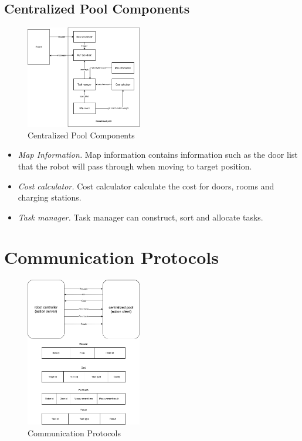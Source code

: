 \subsection{Centralized Pool Components}

\begin{figure}[htb]
	\centering
	\includegraphics[width = 0.45\textwidth]{content/images/ch3/system_component_centralized_pool.drawio.png}
	\caption{Centralized Pool Components}
	\label{fig:centralized_pool_components}
\end{figure}

\begin{itemize}
	\item \textsl{Map Information.} Map information contains information such as the door list that the robot will pass through when moving to target position.
	\item \textsl{Cost calculator.} Cost calculator calculate the cost for doors, rooms and charging stations.
	\item \textsl{Task manager.} Task manager can construct, sort and allocate tasks.
\end{itemize}


\section{Communication Protocols}

\begin{figure}[htb]
	\centering
	\includegraphics[width = 0.45\textwidth]{content/images/ch3/communication_protocals.drawio.png}
	\caption{Communication Protocols}
	\label{fig:communication_protocals}
\end{figure}

